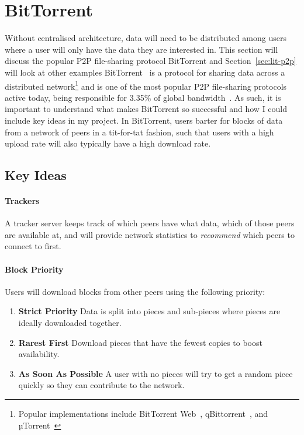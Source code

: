 
\section{BitTorrent}\label{sec:bittorrent}

Without centralised architecture, data will need to be distributed among users where a user will only have the data they are interested in. This section will discuss the popular P2P file-sharing protocol BitTorrent and Section~\ref{sec:lit-p2p} will look at other examples
\x
BitTorrent~\cite{kaune_unraveling_2010, pouwelse_bittorrent_2005} is a protocol for sharing data across a distributed network\footnote{Popular implementations include BitTorrent Web~\cite{inc_bittorrent_nodate}, qBittorrent~\cite{noauthor_qbittorrent_nodate}, and µTorrent~\cite{inc_torrent_nodate}} and is one of the most popular P2P file-sharing protocols active today, being responsible for 3.35\% of global bandwidth~\cite{noauthor_application_nodate}. 
As such, it is important to understand what makes BitTorrent so successful and how I could include key ideas in my project.
In BitTorrent, users barter for blocks of data from a network of peers in a tit-for-tat fashion, such that users with a high upload rate will also typically have a high download rate.

\subsection*{Key Ideas}

\paragraph*{Trackers}
A tracker server keeps track of which peers have what data, which of those peers are available at, and will provide network statistics to \textit{recommend} which peers to connect to first.

\paragraph*{Block Priority}
Users will download blocks from other peers using the following priority:
\begin{enumerate}
  \item \textbf{Strict Priority} Data is split into pieces and sub-pieces where pieces are ideally downloaded together.
  \item \textbf{Rarest First} Download pieces that have the fewest copies to boost availability.
  \item \textbf{As Soon As Possible} A user with no pieces will try to get a random piece quickly so they can contribute to the network. 
\end{enumerate}

